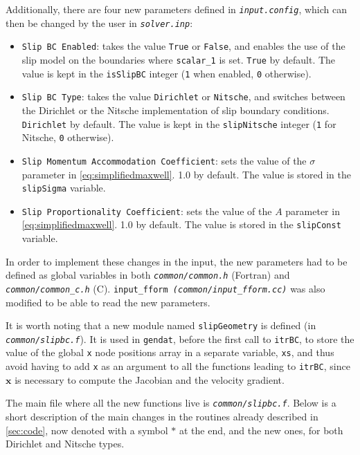 \documentclass{ucb}
\begin{document}
\pagebreak

Additionally, there are four new parameters defined in \texttt{\textit{input.config}}, which can then be changed by the user in \texttt{\textit{solver.inp}}:
\begin{itemize}
    \item \texttt{Slip BC Enabled}: takes the value \texttt{True} or \texttt{False}, and enables the use of the slip model on the boundaries where \texttt{scalar\_1} is set. \texttt{True} by default. The value is kept in the \texttt{isSlipBC} integer (\texttt{1} when enabled, \texttt{0} otherwise).
    \item \texttt{Slip BC Type}: takes the value \texttt{Dirichlet} or \texttt{Nitsche}, and switches between the Dirichlet or the Nitsche implementation of slip boundary conditions. \texttt{Dirichlet} by default. The value is kept in the \texttt{slipNitsche} integer (\texttt{1} for Nitsche, \texttt{0} otherwise).
    \item \texttt{Slip Momentum Accommodation Coefficient}: sets the value of the $\sigma$ parameter in \autoref{eq:simplifiedmaxwell}. \num{1.0} by default. The value is stored in the \texttt{slipSigma} variable.
    \item \texttt{Slip Proportionality Coefficient}: sets the value of the $A$ parameter in \autoref{eq:simplifiedmaxwell}. \num{1.0} by default. The value is stored in the \texttt{slipConst} variable.
\end{itemize}

In order to implement these changes in the input, the new parameters had to be defined as global variables in both \texttt{\textit{common/common.h}} (Fortran) and \texttt{\textit{common/common\_c.h}} (C). \texttt{input\_fform \textit{(common/input\_fform.cc)}} was also modified to be able to read the new parameters.

It is worth noting that a new module named \texttt{slipGeometry} is defined (in \texttt{\textit{common/slipbc.f}}). It is used in \texttt{gendat}, before the first call to \texttt{itrBC}, to store the value of the global \texttt{x} node positions array in a separate variable, \texttt{xs}, and thus avoid having to add \texttt{x} as an argument to all the functions leading to \texttt{itrBC}, since $\bm{x}$ is necessary to compute the Jacobian and the velocity gradient.

The main file where all the new functions live is \texttt{\textit{common/slipbc.f}}. Below is a short description of the main changes in the routines already described in \autoref{sec:code}, now denoted with a symbol $\texttt{*}$ at the end, and the new ones, for both Dirichlet and Nitsche types.
\end{document}
